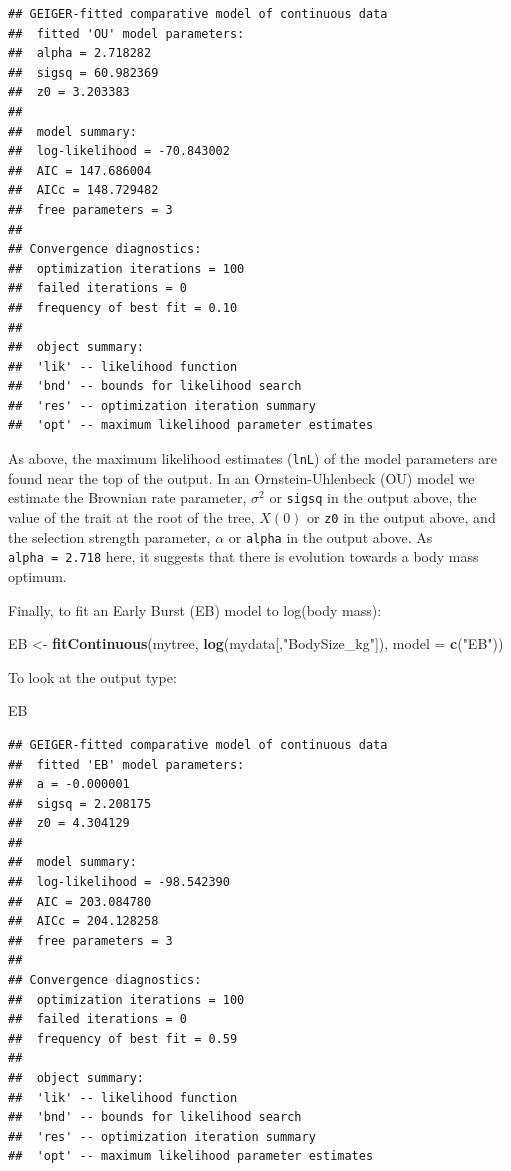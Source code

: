 \documentclass[]{book}
\newenvironment{Shaded}{\begin{snugshade}}{\end{snugshade}}
\newcommand{\KeywordTok}[1]{\textcolor[rgb]{0.13,0.29,0.53}{\textbf{{#1}}}}
\newcommand{\DataTypeTok}[1]{\textcolor[rgb]{0.13,0.29,0.53}{{#1}}}
\newcommand{\StringTok}[1]{\textcolor[rgb]{0.31,0.60,0.02}{{#1}}}
\newcommand{\NormalTok}[1]{{#1}}
\begin{document}
\begin{verbatim}
## GEIGER-fitted comparative model of continuous data
##  fitted 'OU' model parameters:
##  alpha = 2.718282
##  sigsq = 60.982369
##  z0 = 3.203383
## 
##  model summary:
##  log-likelihood = -70.843002
##  AIC = 147.686004
##  AICc = 148.729482
##  free parameters = 3
## 
## Convergence diagnostics:
##  optimization iterations = 100
##  failed iterations = 0
##  frequency of best fit = 0.10
## 
##  object summary:
##  'lik' -- likelihood function
##  'bnd' -- bounds for likelihood search
##  'res' -- optimization iteration summary
##  'opt' -- maximum likelihood parameter estimates
\end{verbatim}

As above, the maximum likelihood estimates (\texttt{lnL}) of the model
parameters are found near the top of the output. In an
Ornstein-Uhlenbeck (OU) model we estimate the Brownian rate parameter,
\(\sigma^2\) or \texttt{sigsq} in the output above, the value of the
trait at the root of the tree, \(X(0)\) or \texttt{z0} in the output
above, and the selection strength parameter, \(\alpha\) or
\texttt{alpha} in the output above. As \texttt{alpha\ =\ 2.718} here, it
suggests that there is evolution towards a body mass optimum.

Finally, to fit an Early Burst (EB) model to log(body mass):

\begin{Shaded}
\begin{Highlighting}[]
\NormalTok{EB <-}\StringTok{ }\KeywordTok{fitContinuous}\NormalTok{(mytree, }\KeywordTok{log}\NormalTok{(mydata[,}\StringTok{"BodySize_kg"}\NormalTok{]), }\DataTypeTok{model =} \KeywordTok{c}\NormalTok{(}\StringTok{"EB"}\NormalTok{))}
\end{Highlighting}
\end{Shaded}

To look at the output type:

\begin{Shaded}
\begin{Highlighting}[]
\NormalTok{EB}
\end{Highlighting}
\end{Shaded}

\begin{verbatim}
## GEIGER-fitted comparative model of continuous data
##  fitted 'EB' model parameters:
##  a = -0.000001
##  sigsq = 2.208175
##  z0 = 4.304129
## 
##  model summary:
##  log-likelihood = -98.542390
##  AIC = 203.084780
##  AICc = 204.128258
##  free parameters = 3
## 
## Convergence diagnostics:
##  optimization iterations = 100
##  failed iterations = 0
##  frequency of best fit = 0.59
## 
##  object summary:
##  'lik' -- likelihood function
##  'bnd' -- bounds for likelihood search
##  'res' -- optimization iteration summary
##  'opt' -- maximum likelihood parameter estimates
\end{verbatim}
\end{document}
